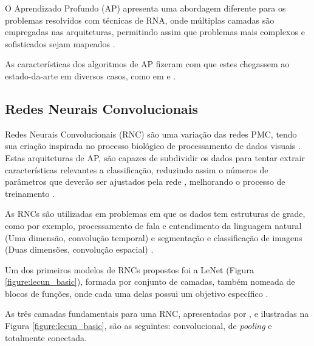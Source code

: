 \par O Aprendizado Profundo (AP) apresenta uma abordagem diferente para os problemas resolvidos com técnicas de RNA, onde múltiplas camadas são empregadas nas arquiteturas, permitindo assim que problemas mais complexos e sofisticados sejam mapeados \cite{Goodfellow-et-al-2016}.

\par As características dos algoritmos de AP fizeram com que estes chegassem ao estado-da-arte em diversos casos, como em  e . 

\subsection{Redes Neurais Convolucionais}

\par Redes Neurais Convolucionais (RNC) são uma variação das redes PMC, tendo sua criação inspirada no processo biológico de processamento de dados visuais \cite{Caroline2016}. Estas arquiteturas de AP, são capazes de subdividir os dados para tentar extrair características relevantes a classificação, reduzindo assim o números de parâmetros que deverão ser ajustados pela rede \cite{Miyazaki2017}, melhorando o processo de treinamento \cite{Miyazaki2017}.

\par As RNCs são utilizadas em problemas em que os dados tem estruturas de grade, como por exemplo, processamento de fala e entendimento da linguagem natural (Uma dimensão, convolução temporal) \cite{Miyazaki2017} e segmentação e classificação de imagens (Duas dimensões, convolução espacial) \cite{Miyazaki2017, Goodfellow-et-al-2016}.

\par Um dos primeiros modelos de RNCs propostos foi a LeNet \cite{LeCun1998} (Figura \ref{figure:lecun_basic}), formada por conjunto de camadas, também nomeada de blocos de funções, onde cada uma delas possui um objetivo específico \cite{Carneiro2017}.


\par As três camadas fundamentais para uma RNC, apresentadas por , e ilustradas na Figura \ref{figure:lecun_basic}, são as seguintes: convolucional, de \textit{pooling} e totalmente conectada.

